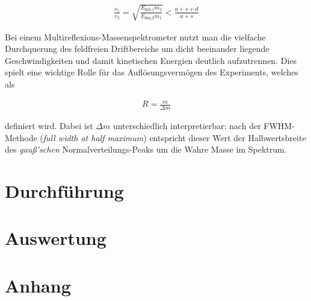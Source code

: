\documentclass[numbers=noenddot,a4paper,notitlepage,twoside,BCOR15mm]{scrartcl}
\newcommand{\ix}[1]{_\text{#1}}
\newcommand{\tilt}[1]{\textit{#1}}
\begin{document}
		\begin{align}
			\frac{v\ix{1}}{v\ix{2}}=\sqrt{\frac{E\ix{kin,1}m\ix{2}}{E\ix{kin,2}m\ix{1}}}<\frac{a+s+d}{a+s} \label{eq:speicher}
		\end{align}

		Bei einem Multireflexions-Massenspektrometer nutzt man die vielfache Durchquerung des feldfreien Driftbereichs um dicht beeinander liegende Geschwindigkeiten und damit kinetischen Energien deutlich aufzutrennen. Dies spielt eine wichtige Rolle für das Auflösungsvermögen des Experiments, welches als

			\begin{align}
				R=\frac{m}{\Delta m} \label{eq:aufloes}
			\end{align}

		definiert wird. Dabei ist $\Delta m$ unterschiedlich interpretierbar: nach der FWHM-Methode (\tilt{full width at half maximum}) entspricht dieser Wert der Halbwertsbreite des \tilt{gauß'schen} Normalverteilungs-Peaks um die Wahre Masse im Spektrum.

	\newpage
	\section{Durchführung}
	
	\newpage
	\section{Auswertung}
	
	\newpage
	\section{Anhang}

		
		
\end{document}
